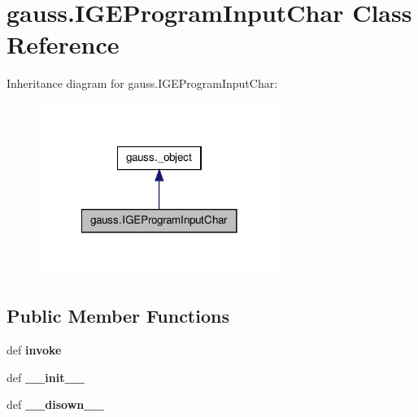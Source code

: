 \hypertarget{classgauss_1_1_i_g_e_program_input_char}{\section{gauss.\-I\-G\-E\-Program\-Input\-Char Class Reference}
\label{classgauss_1_1_i_g_e_program_input_char}
}


Inheritance diagram for gauss.\-I\-G\-E\-Program\-Input\-Char\-:\nopagebreak
\begin{figure}[H]
\begin{center}
\leavevmode
\includegraphics[width=222pt]{classgauss_1_1_i_g_e_program_input_char__inherit__graph}
\end{center}
\end{figure}
\subsection*{Public Member Functions}
\begin{DoxyCompactItemize}
\item 
\hypertarget{classgauss_1_1_i_g_e_program_input_char_a9925ea08b8511d82bf1bbbcc68869032}{def {\bfseries invoke}}\label{classgauss_1_1_i_g_e_program_input_char_a9925ea08b8511d82bf1bbbcc68869032}

\item 
\hypertarget{classgauss_1_1_i_g_e_program_input_char_a7c48e71d52235177b8dd7d49e634ca49}{def {\bfseries \-\_\-\-\_\-init\-\_\-\-\_\-}}\label{classgauss_1_1_i_g_e_program_input_char_a7c48e71d52235177b8dd7d49e634ca49}

\item 
\hypertarget{classgauss_1_1_i_g_e_program_input_char_a0d1501ff0b067384d941952dc6ee509e}{def {\bfseries \-\_\-\-\_\-disown\-\_\-\-\_\-}}\label{classgauss_1_1_i_g_e_program_input_char_a0d1501ff0b067384d941952dc6ee509e}

\end{DoxyCompactItemize}
